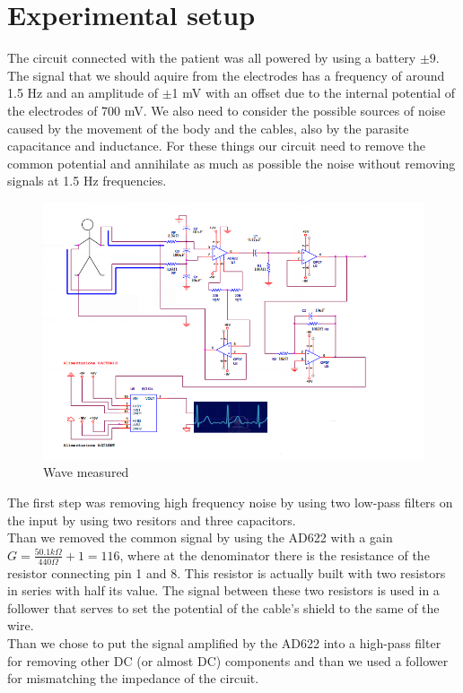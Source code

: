 \section{Experimental setup}
The circuit connected with the patient was all powered by using a battery $\pm 9$.\\
The signal that we should aquire from the electrodes has a frequency of around 1.5 Hz and an amplitude of $\pm$1 mV with an offset due to the internal potential of the electrodes of 700 mV. We also need to consider the possible sources of noise caused by the movement of the body and the cables, also by the parasite capacitance and inductance. For these things our circuit need to remove the common potential and annihilate as much as possible the noise without removing signals at 1.5 Hz frequencies.\\
\begin{figure}[H]
\centering
\includegraphics[width=.8\textwidth]{8/circuit.png}
\caption{Wave measured}
\end{figure}
The  first step was removing high frequency noise by using two low-pass filters on the input by using two resitors and three capacitors.\\

Than we removed the common signal by using the AD622 with a gain $G =   \frac{50.1 k\Omega}{440 \Omega} + 1 = 116$, where at the denominator there is the resistance of the resistor connecting pin 1 and 8. This resistor is actually built with two resistors in series with half its value. The signal between these two resistors is used in a follower that serves to set the potential of the cable's shield to the same of the wire.\\

Than we chose to put the signal amplified by the AD622 into a high-pass filter for removing other DC (or almost DC) components and than we used a follower for mismatching the impedance of the circuit.\\

